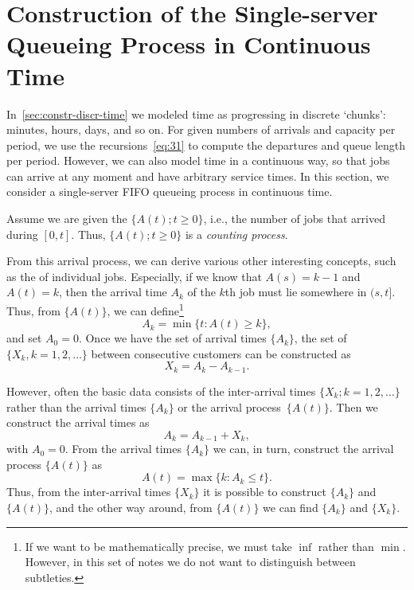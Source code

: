 \section
[Single-server Queueing Process in Continuous Time]
{Construction of the Single-server Queueing Process in Continuous Time}
\label{sec:constr-gg1-queu}



In~\cref{sec:constr-discr-time} we modeled time as progressing in discrete `chunks': minutes, hours, days, and so on.
For given numbers of arrivals and capacity per period, we use the recursions~\cref{eq:31} to compute the departures and queue length per period.
However, we can also model time in a continuous way, so that jobs can arrive at any moment and have arbitrary service times. 
In this section, we consider a single-server FIFO queueing process in continuous time.

Assume we are given the  $\{A(t); t\geq 0\}$, i.e., the number of jobs that arrived during $[0,t]$.
Thus, $\{A(t); t\geq 0\}$ is a \emph{counting process}.

From this arrival process, we can derive various other interesting concepts, such as the  of individual jobs.
Especially, if we know that $A(s) = k-1$ and $A(t) = k$, then the arrival time $A_k$ of the $k$th job must lie somewhere in $(s,t]$.
Thus, from $\{A(t)\}$, we can define\footnote{If we want to be mathematically precise, we must take $\inf$ rather than $\min$.
 However, in this set of notes we do not want to distinguish between subtleties.}
\begin{equation}\label{eq:27}
 A_k = \min\{t: A(t) \geq k\},
\end{equation}
and set $A_0 = 0$.
Once we have the set of arrival times $\{A_k\}$, the set of  $\{X_k, k=1, 2, \ldots\}$ between consecutive customers can be constructed as
\begin{equation}
 X_k = A_k - A_{k-1}.
\end{equation}

However, often the basic data consists of the inter-arrival times $\{X_k; k=1,2,\ldots\}$ rather than the arrival times $\{A_k\}$ or the arrival process~$\{A(t)\}$.
Then we construct the arrival times as
\begin{equation*}
 A_k = A_{k-1} + X_k,
\end{equation*}
with $A_0 = 0$.
From the arrival times $\{A_k\}$ we can, in turn, construct the arrival process $\{A(t)\}$ as
\begin{equation} \label{eq:2}
 A(t) = \max\{k: A_k \leq t\}.
\end{equation}
Thus, from the inter-arrival times $\{X_k\}$ it is possible to construct $\{A_k\}$ and $\{A(t)\}$, and the other way around, from $\{A(t)\}$ we can find $\{A_k\}$ and $\{X_k\}$.


